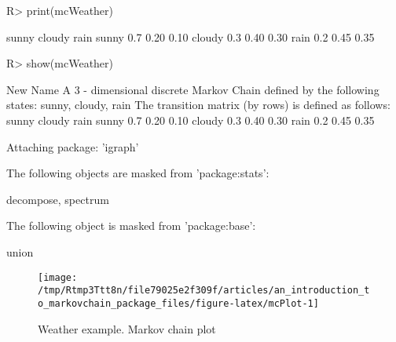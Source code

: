 \documentclass[
  nojss]{jss}
\begin{document}
\begin{CodeChunk}

\begin{CodeInput}
R> print(mcWeather)
\end{CodeInput}

\begin{CodeOutput}
       sunny cloudy rain
sunny    0.7   0.20 0.10
cloudy   0.3   0.40 0.30
rain     0.2   0.45 0.35
\end{CodeOutput}

\begin{CodeInput}
R> show(mcWeather)
\end{CodeInput}

\begin{CodeOutput}
New Name 
 A  3 - dimensional discrete Markov Chain defined by the following states: 
 sunny, cloudy, rain 
 The transition matrix  (by rows)  is defined as follows: 
       sunny cloudy rain
sunny    0.7   0.20 0.10
cloudy   0.3   0.40 0.30
rain     0.2   0.45 0.35
\end{CodeOutput}
\end{CodeChunk}

\begin{CodeChunk}

\begin{CodeOutput}

Attaching package: 'igraph'
\end{CodeOutput}

\begin{CodeOutput}
The following objects are masked from 'package:stats':

    decompose, spectrum
\end{CodeOutput}

\begin{CodeOutput}
The following object is masked from 'package:base':

    union
\end{CodeOutput}
\begin{figure}

{\centering \texttt{[image: /tmp/Rtmp3Ttt8n/file79025e2f309f/articles/an\_introduction\_to\_markovchain\_package\_files/figure-latex/mcPlot-1]} 

}

\caption[Weather example]{Weather example. Markov chain plot}\label{fig:mcPlot}
\end{figure}
\end{CodeChunk}
\end{document}
